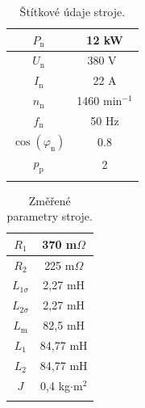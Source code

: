 \documentclass[a4paper, twoside, 11pt]{article}
\begin{document}
    \begin{minipage}[t]{0.47\textwidth}
        \vspace{\baselineskip}
        \begin{table}[H]
            \caption{Štítkové údaje stroje.}
            \centering
                \begin{tabular}{!{\vrule width 2pt} c | c !{\vrule width 2pt}}
                    $P_\text{n}$ & 12 kW \\ \hline
                    $U_\text{n}$ & 380 V~\\ \hline
                    $I_\text{n}$ & 22 A\\ \hline
                    $n_\text{n}$ & 1460 min$^{-1}$ \\ \hline
                    $f_\text{n}$ & 50 Hz \\ \hline
                    $\cos(\varphi_\text{n})$ &  0.8 \\ \hline
                    $p_\text{p}$ & 2 \\ 
                \end{tabular}     
            \label{tab:stitkove-udaje}
        \end{table}
        \end{minipage}%
        \hfill
        \begin{minipage}[t]{0.47\textwidth}
            \vspace{0pt}
            \begin{table}[H]
                \caption{Změřené parametry stroje.}
                \centering
                    \begin{tabular}{!{\vrule width 2pt} c | c !{\vrule width 2pt}}
                        $R_\text{1}$ & 370 m$\Omega$ \\ \hline
                        $R_\text{2}$ & 225 m$\Omega$ \\ \hline
                        $L_{1\sigma}$ & 2,27 mH \\ \hline
                        $L_{2\sigma}$ & 2,27 mH \\ \hline
                        $L_\text{m}$ & 82,5 mH \\ \hline
                        $L_{1}$ & 84,77 mH \\ \hline
                        $L_{2}$ & 84,77 mH \\ \hline $J$ & 0,4 kg$\cdot$m$^{2}$ \\ 
                    \end{tabular}     
                \label{tab:zmerene-parametry-stroje}
            \end{table}
        \end{minipage}
\end{document}
